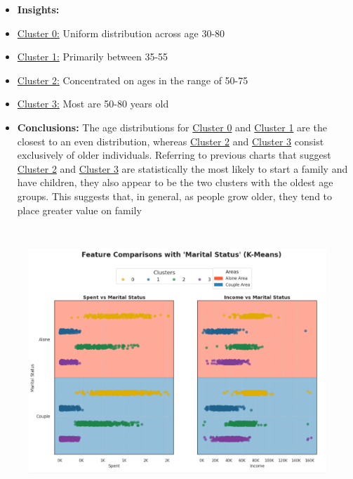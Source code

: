 \documentclass[11pt]{article}
\begin{document}
\vspace{1\baselineskip}
\begin{itemize}
	\item \textbf{Insights:}

\end{itemize}
\begin{itemize}
	\item \uline{\textcolor[HTML]{BF9000}{Cluster 0:}} Uniform distribution across age 30-80

	\item \uline{\textcolor[HTML]{0B5394}{Cluster 1:}} Primarily between 35-55

	\item \uline{\textcolor[HTML]{38761D}{Cluster 2:}} Concentrated on ages in the range of 50-75

	\item \uline{\textcolor[HTML]{674EA7}{Cluster 3:}} Most are 50-80 years old

\end{itemize}
\vspace{1\baselineskip}
\begin{itemize}
	\item \textbf{Conclusions:} The age distributions for \uline{\textcolor[HTML]{BF9000}{Cluster 0}} and \uline{\textcolor[HTML]{0B5394}{Cluster 1}} are the closest to an even distribution, whereas \uline{\textcolor[HTML]{38761D}{Cluster 2}} and \uline{\textcolor[HTML]{674EA7}{Cluster 3}} consist exclusively of older individuals. Referring to previous charts that suggest \uline{\textcolor[HTML]{38761D}{Cluster 2}} and \uline{\textcolor[HTML]{674EA7}{Cluster 3}} are statistically the most likely to start a family and have children, they also appear to be the two clusters with the oldest age groups. This suggests that, in general, as people grow older, they tend to place greater value on family

\end{itemize}
\vspace{2\baselineskip}
\begin{figure}[H]
\centering
\includegraphics[width=13.33cm,height=10.12cm]{./images/image32.png}
\end{figure}
\end{document}
